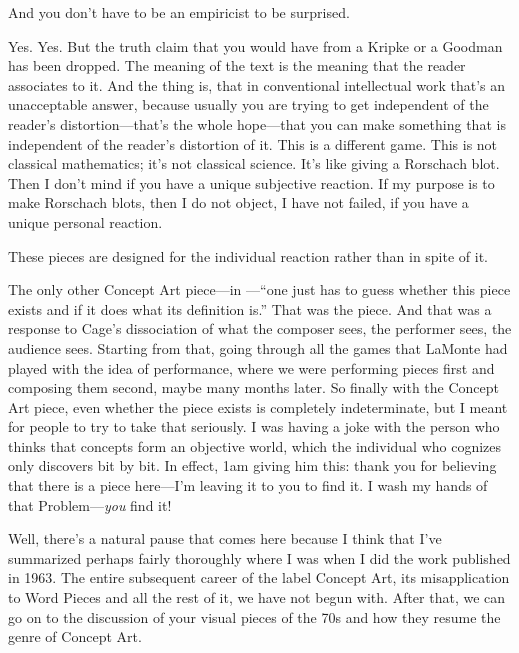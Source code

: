  And you don't have to be an empiricist to be surprised. 

 Yes. Yes. But the truth claim that you would have from a 
Kripke or a Goodman has been dropped. The meaning of the text is the 
meaning that the reader associates to it. And the thing is, that in 
conventional intellectual work that's an unacceptable answer, because 
usually you are trying to get independent of the reader's 
distortion---that's the whole hope---that you can make something that is 
independent of the reader's distortion of it. This is a different game. This is not 
classical mathematics; it's not classical science. It's like giving a 
Rorschach blot. Then I don't mind if you have a unique subjective reaction. 
If my purpose is to make Rorschach blots, then I do not object, I have 
not failed, if you have a unique personal reaction. 

These pieces are designed for the individual reaction rather than in 
spite of it. 

The only other Concept Art piece---in ---\enquote{one just 
has to guess whether this piece exists and if it does what its definition 
is.} That was the piece. And that was a response to Cage's dissociation 
of what the composer sees, the performer sees, the audience sees. 
Starting from that, going through all the games that LaMonte had 
played with the idea of performance, where we were performing pieces 
first and composing them second, maybe many months later. So finally 
with the Concept Art piece, even whether the piece exists is completely 
indeterminate, but I meant for people to try to take that seriously. I was 
having a joke with the person who thinks that concepts form an 
objective world, which the individual who cognizes only discovers bit 
by bit. In effect, 1am giving him this: thank you for believing that there 
is a piece here---I'm leaving it to you to find it. I wash my hands of that 
Problem---\emph{you} find it! 

Well, there's a natural pause that comes here because I think that 
I've summarized perhaps fairly thoroughly where I was when I did the 
work published in 1963. The entire subsequent career of the label 
Concept Art, its misapplication to Word Pieces and all the rest of it, we 
have not begun with. After that, we can go on to the discussion of your 
visual pieces of the 70s and how they resume the genre of Concept Art. 

